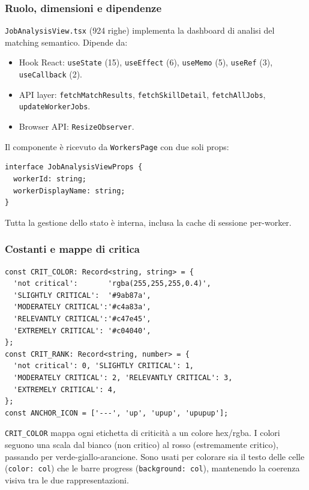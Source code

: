 \documentclass[a4paper,12pt]{article}
\begin{document}
\subsubsection{Ruolo, dimensioni e dipendenze}

\texttt{JobAnalysisView.tsx} (924 righe) implementa la dashboard
di analisi del matching semantico. Dipende da:
\begin{itemize}[noitemsep]
  \item Hook React: \texttt{useState} (15), \texttt{useEffect} (6),
        \texttt{useMemo} (5), \texttt{useRef} (3), \texttt{useCallback} (2).
  \item API layer: \texttt{fetchMatchResults}, \texttt{fetchSkillDetail},
        \texttt{fetchAllJobs}, \texttt{updateWorkerJobs}.
  \item Browser API: \texttt{ResizeObserver}.
\end{itemize}

Il componente \`{e} ricevuto da \texttt{WorkersPage} con due soli props:
\begin{lstlisting}
interface JobAnalysisViewProps {
  workerId: string;
  workerDisplayName: string;
}
\end{lstlisting}

\noindent Tutta la gestione dello stato \`{e} interna, inclusa la cache di sessione
per-worker.

\subsubsection{Costanti e mappe di critica}
\vspace{2pt}
\begin{lstlisting}
const CRIT_COLOR: Record<string, string> = {
  'not critical':       'rgba(255,255,255,0.4)',
  'SLIGHTLY CRITICAL':  '#9ab87a',
  'MODERATELY CRITICAL':'#c4a83a',
  'RELEVANTLY CRITICAL':'#c47e45',
  'EXTREMELY CRITICAL': '#c04040',
};
const CRIT_RANK: Record<string, number> = {
  'not critical': 0, 'SLIGHTLY CRITICAL': 1,
  'MODERATELY CRITICAL': 2, 'RELEVANTLY CRITICAL': 3,
  'EXTREMELY CRITICAL': 4,
};
const ANCHOR_ICON = ['---', 'up', 'upup', 'upupup'];
\end{lstlisting}

\noindent \texttt{CRIT\_COLOR} mappa ogni etichetta di criticit\`{a} a un colore
hex/rgba. I colori seguono una scala dal bianco (non critico) al rosso
(estremamente critico), passando per verde-giallo-arancione. Sono usati
per colorare sia il testo delle celle (\texttt{color: col}) che le
barre progress (\texttt{background: col}), mantenendo la coerenza
visiva tra le due rappresentazioni.
\end{document}
